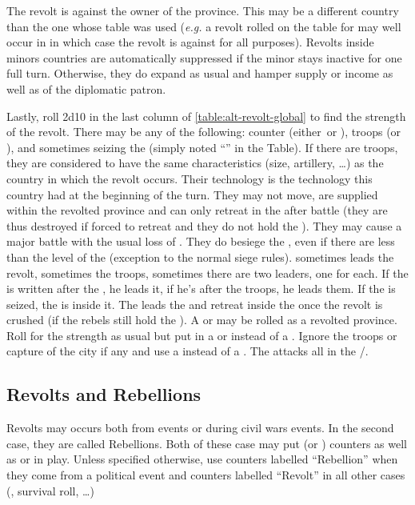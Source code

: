 \aparag The revolt is against the owner of the province. This may be a
different country than the one whose table was used (\emph{e.g.} a
revolt rolled on the table for \FRA may well occur in \SPA in which case
the revolt is against \SPA for all purposes).
\bparag Revolts inside minors countries are automatically suppressed if
the minor stays inactive for one full turn. Otherwise, they do expand as
usual and hamper supply or income as well as \STAB of the diplomatic
patron.

\aparag[Strength] Lastly, roll 2d10 in the last column of
\ref{table:alt-revolt-global} to find the strength of the revolt.
\bparag There may be any of the following: \REVOLT counter (either\
\facemoins or \Faceplus), troops (\LD or \ARMY\facemoins), \LeaderG and
sometimes seizing the \fortress (simply noted ``\fortress'' in the
Table).
\bparag If there are troops, they are considered to have the same
characteristics (size, artillery, \ldots) as the country in which the
revolt occurs. Their technology is the technology this country had at
the beginning of the turn. They may not move, are supplied within the
revolted province and can only retreat in the \fortress after battle
(they are thus destroyed if forced to retreat and they do not hold the
\fortress). They may cause a major battle with the usual loss of
\STAB. They do besiege the \fortress, even if there are less \LD than
the level of the \fortress (exception to the normal siege rules).
\bparag \LeaderG sometimes leads the revolt, sometimes the troops,
sometimes there are two leaders, one for each. If the \LeaderG is
written after the \REVOLT, he leads it, if he's after the troops, he
leads them.
\bparag If the \fortress is seized, the \LD is inside it. The \LeaderG
leads the \REVOLT and retreat inside the \fortress once the revolt is
crushed (if the rebels still hold the \fortress).
\bparag A \CTZ or \STZ may be rolled as a revolted province. Roll for
the strength as usual but put in a \PIRATE\facemoins or \PIRATE\faceplus
instead of a \REVOLT. Ignore the troops or capture of the city if any
and use a \LeaderA instead of a \LeaderG. The \PIRATE attacks all
\TradeFLEET in the \CTZ/\STZ.

\subsection{Revolts and Rebellions}
\aparag Revolts may occurs both from \RD events or during civil wars
events. In the second case, they are called Rebellions.
\bparag Both of these case may put \REVOLT (or \REBELLION) counters as
well as \ARMY or \LD in play.
\bparag Unless specified otherwise, use counters labelled ``Rebellion''
when they come from a political event and counters labelled ``Revolt''
in all other cases (\RD, \TUR survival roll, \ldots)

